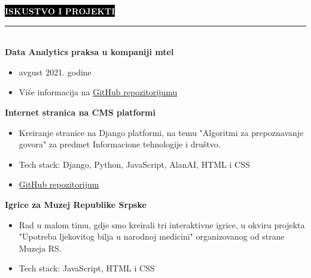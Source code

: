 \documentclass[9pt]{developercv} %
\begin{document}
\colorbox{black}{{\textcolor{white}{\textbf{\MakeUppercase{Iskustvo i projekti}}}}}
\par\noindent\rule{\textwidth}{2px}\\

    {\textbf{Data Analytics praksa u kompaniji mtel}}
	\begin{itemize}
	    \item avgust 2021. godine
        \item [\faExternalLink] Više informacija na {\href{https://github.com/vladocodes/data-analytics-internship}{GitHub repozitorijumu}}\\

    \end{itemize}

\begin{minipage}[t]{0.45\textwidth}
	\vspace{-\baselineskip}
	
	{\textbf{Internet stranica na CMS platformi}}
	\begin{itemize}
        \item Kreiranje stranice na Django platformi, na temu "Algoritmi za prepoznavanje govora" za predmet Informacione tehnologije i društvo.
        \item Tech stack: Django, Python, JavaScript, AlanAI, HTML i CSS
        
        \item [\faExternalLink]{\href{https://github.com/vladocodes/PMF_ITAS_CMS}{GitHub repozitorijum}}
    \end{itemize}
\end{minipage}
\hfill
\begin{minipage}[t]{0.45\textwidth}
    \vspace{-\baselineskip}
    
    {\textbf{Igrice za Muzej Republike Srpske}}
    \begin{itemize}
        \item Rad u malom timu, gdje smo kreirali tri interaktivne igrice, u okviru projekta "Upotreba ljekovitog bilja u narodnoj medicini" organizovanog od strane Muzeja RS.
        \item  Tech stack: JavaScript, HTML i CSS
    \end{itemize}
\end{minipage}

\vspace{0.7cm}



\end{document}

